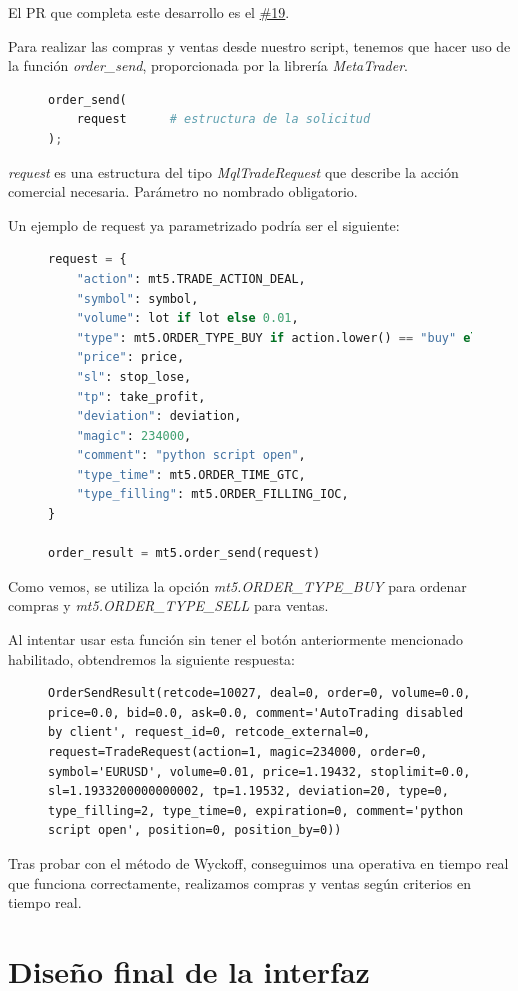 El PR que completa este desarrollo es el \href{https://github.com/mcarmona99/TFG/pull/19}{\#19}. \newline

Para realizar las compras y ventas desde nuestro script, tenemos que hacer uso de la función \textit{order\_send}, proporcionada por la librería \textit{MetaTrader}.

\begin{figure}[h]
	\begin{lstlisting}[language=Python]
order_send(
	request      # estructura de la solicitud
);
	\end{lstlisting}
\end{figure}


\textit{request} es una estructura del tipo \textit{MqlTradeRequest} que describe la acción comercial necesaria. Parámetro no nombrado obligatorio.  \newline

Un ejemplo de request ya parametrizado podría ser el siguiente:\newline

\begin{figure}[h]
	\begin{lstlisting}[language=Python]
request = {
	"action": mt5.TRADE_ACTION_DEAL,
	"symbol": symbol,
	"volume": lot if lot else 0.01,
	"type": mt5.ORDER_TYPE_BUY if action.lower() == "buy" else mt5.ORDER_TYPE_SELL,
	"price": price,
	"sl": stop_lose,
	"tp": take_profit,
	"deviation": deviation,
	"magic": 234000,
	"comment": "python script open",
	"type_time": mt5.ORDER_TIME_GTC,
	"type_filling": mt5.ORDER_FILLING_IOC,
}

order_result = mt5.order_send(request)
	\end{lstlisting}
\end{figure}

Como vemos, se utiliza la opción \textit{mt5.ORDER\_TYPE\_BUY} para ordenar compras y \textit{mt5.ORDER\_TYPE\_SELL} para ventas.

Al intentar usar esta función sin tener el botón anteriormente mencionado habilitado, obtendremos la siguiente respuesta:\newline

\begin{figure}[h]
	\begin{lstlisting}
OrderSendResult(retcode=10027, deal=0, order=0, volume=0.0, price=0.0, bid=0.0, ask=0.0, comment='AutoTrading disabled by client', request_id=0, retcode_external=0, request=TradeRequest(action=1, magic=234000, order=0, symbol='EURUSD', volume=0.01, price=1.19432, stoplimit=0.0, sl=1.1933200000000002, tp=1.19532, deviation=20, type=0, type_filling=2, type_time=0, expiration=0, comment='python script open', position=0, position_by=0))
	\end{lstlisting}
\end{figure}

Tras probar con el método de Wyckoff, conseguimos una operativa en tiempo real que funciona correctamente, realizamos compras y ventas según criterios en tiempo real.

\section{Diseño final de la interfaz}


